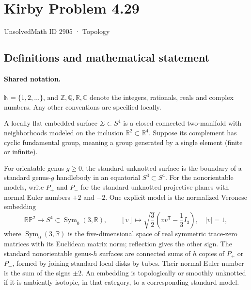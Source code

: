 \documentclass[11pt]{article}
\begin{document}
\setcounter{section}{2904}
\section{Kirby Problem 4.29}\label{2905}
{\small\sffamily UnsolvedMath ID 2905 · Topology}
\subsection{Definitions and mathematical statement}

\paragraph{Shared notation.}$\mathbb N=\{1,2,\ldots\}$, and $\mathbb Z,\mathbb Q,\mathbb R,\mathbb C$ denote the integers, rationals, reals and complex numbers. Any other conventions are specified locally.


A locally flat embedded surface $\Sigma\subset S^4$ is a closed connected two-manifold with neighborhoods modeled on the inclusion $\mathbb R^2\subset\mathbb R^4$. Suppose its complement has cyclic fundamental group, meaning a group generated by a single element (finite or infinite).

For orientable genus $g\ge0$, the standard unknotted surface is the boundary of a standard genus-$g$ handlebody in an equatorial $S^3\subset S^4$. For the nonorientable models, write $P_+$ and $P_-$ for the standard unknotted projective planes with normal Euler numbers $+2$ and $-2$. One explicit model is the normalized Veronese embedding
\[
\mathbb{RP}^2\longrightarrow S^4\subset\operatorname{Sym}_0(3,\mathbb R),\qquad
[v]\longmapsto\sqrt{\frac32}\left(vv^{\mathsf T}-\frac13I_3\right),\quad |v|=1,
\]
where $\operatorname{Sym}_0(3,\mathbb R)$ is the five-dimensional space of real symmetric trace-zero matrices with its Euclidean matrix norm; reflection gives the other sign. The standard nonorientable genus-$h$ surfaces are connected sums of $h$ copies of $P_+$ or $P_-$, formed by joining standard local disks by tubes. Their normal Euler number is the sum of the signs $\pm2$. An embedding is topologically or smoothly unknotted if it is ambiently isotopic, in that category, to a corresponding standard model.
\end{document}
